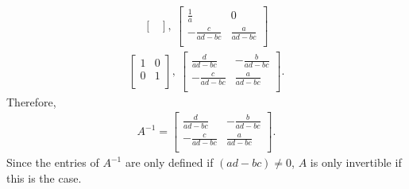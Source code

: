 \documentclass[12pt]{article}
\begin{document}
\begin{enumerate}
\begin{align*}
\begin{bmatrix}
      \end{bmatrix},\
      \begin{bmatrix}
        \frac{1}{a} & 0\\
        -\frac{c}{ad - bc}
          & \frac{a}{ad - bc}\\
      \end{bmatrix}
    \end{align*}
    \begin{align*}
      \begin{bmatrix}
        1 & 0\\
        0 & 1\\
      \end{bmatrix},\
      \begin{bmatrix}
        \frac{d}{ad - bc}
          & -\frac{b}{ad - bc}\\
        -\frac{c}{ad - bc}
          & \frac{a}{ad - bc}\\
      \end{bmatrix}.
    \end{align*}
    Therefore,
    \begin{align*}
      A^{-1} =
      \begin{bmatrix}
        \frac{d}{ad - bc}
          & -\frac{b}{ad - bc}\\
        -\frac{c}{ad - bc}
          & \frac{a}{ad - bc}\\
      \end{bmatrix}.
    \end{align*}
    Since the entries of $A^{-1}$ are only defined if $(ad - bc)
    \neq 0$, $A$ is only invertible if this is the case.

\end{enumerate}
\end{document}
